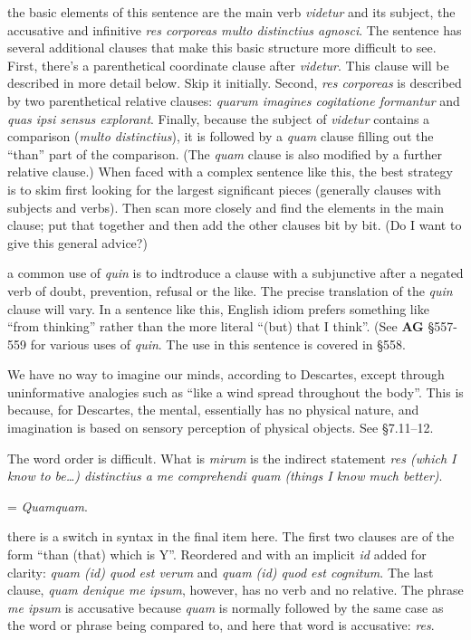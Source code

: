  the basic elements of this sentence are the main verb \textit{videtur} and its subject, the accusative and infinitive \textit{res corporeas multo distinctius agnosci}. The sentence has several additional clauses that make this basic structure more difficult to see. First, there's a parenthetical coordinate clause after \textit{videtur}. This clause will be described in more detail below. Skip it initially. Second, \textit{res corporeas} is described by two parenthetical relative clauses: \textit{quarum imagines cogitatione formantur} and \textit{quas ipsi sensus explorant}. Finally, because the subject of \textit{videtur} contains a comparison (\textit{multo distinctius}), it is followed by a \textit{quam} clause filling out the ``than'' part of the comparison. (The \textit{quam} clause is also modified by a further relative clause.) When faced with a complex sentence like this, the best strategy is to skim first looking for the largest significant pieces (generally clauses with subjects and verbs). Then scan more closely and find the elements in the main clause; put that together and then add the other clauses bit by bit. (Do I want to give this general advice?)

 a common use of \textit{quin} is to indtroduce a clause with a subjunctive after a negated verb of doubt, prevention, refusal or the like. The precise translation of the \textit{quin} clause will vary. In a sentence like this, English idiom prefers something like ``from thinking'' rather than the more literal ``(but) that I think''. (See \textbf{AG} §557-559 for various uses of \textit{quin}. The use in this sentence is covered in §558.

 We have no way to imagine our minds, according to Descartes, except through uninformative analogies such as ``like a wind spread throughout the body''. This is because, for Descartes, the mental, essentially has no physical nature, and imagination is based on sensory perception of physical objects. See §7.11--12.

 The word order is difficult. What is \textit{mirum} is the indirect statement \textit{res (which I know to be\dots) distinctius a me comprehendi quam (things I know much better)}.

 = \textit{Quamquam}.

 there is a switch in syntax in the final item here. The first two clauses are  of the form ``than (that) which is Y''. Reordered and with an implicit \textit{id} added for clarity: \textit{quam (id) quod est verum} and \textit{quam (id) quod est cognitum}. The last clause, \textit{quam denique me ipsum}, however, has no verb and no relative. The phrase \textit{me ipsum} is accusative because \textit{quam} is normally followed by the same case as the word or phrase being compared to, and here that word is accusative: \textit{res}.

